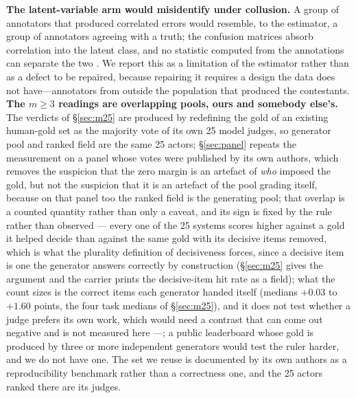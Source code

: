 \documentclass{article}
\begin{document}
\textbf{The latent-variable arm would misidentify under collusion.} A group of annotators that produced correlated errors would resemble, to the estimator, a group of annotators agreeing with a truth; the confusion matrices absorb correlation into the latent class, and no statistic computed from the annotations can separate the two \cite{jasra2005,stephens2000}. We report this as a limitation of the estimator rather than as a defect to be repaired, because repairing it requires a design the data does not have---annotators from outside the population that produced the contestants.
\textbf{The $m\ge 3$ readings are overlapping pools, ours and somebody else's.} The verdicts of \S\ref{sec:m25} are produced by redefining the gold of an existing human-gold set as the majority vote of its own 25 model judges, so generator pool and ranked field are the same 25 actors; \S\ref{sec:panel} repeats the measurement on a panel whose votes were published by its own authors, which removes the suspicion that the zero margin is an artefact of \emph{who} imposed the gold, but not the suspicion that it is an artefact of the pool grading itself, because on that panel too the ranked field is the generating pool; that overlap is a counted quantity rather than only a caveat, and its sign is fixed by the rule rather than
observed --- every one of the 25 systems scores higher against a gold it helped decide than against the same gold
with its decisive items removed, which is what the plurality definition of decisiveness forces, since a decisive
item is one the generator answers correctly by construction (\S\ref{sec:m25} gives the argument and the carrier
prints the decisive-item hit rate as a field); what the count sizes is the correct items each generator handed
itself (medians $+0.03$ to $+1.60$ points, the four task medians of \S\ref{sec:m25}), and it does not test whether
a judge prefers its own work, which would need a contrast that can come out negative and is not measured here ---; a public leaderboard whose gold is produced by three or more independent generators would test the ruler harder, and we do not have one. The set we reuse is documented by its own authors as a reproducibility benchmark rather than a correctness one, and the 25 actors ranked there are its judges.
\end{document}
